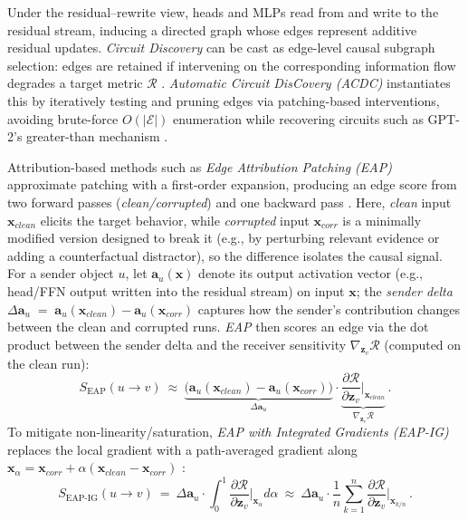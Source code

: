 \documentclass[11pt,letterpaper]{mystyle}
\begin{document}
Under the residual--rewrite view, heads and MLPs read from and write to the residual stream, inducing a directed graph whose edges represent additive residual updates.
\textit{Circuit Discovery} can be cast as edge-level causal subgraph selection: edges are retained if intervening on the corresponding information flow degrades a target metric $\mathcal{R}$ \citep{goldowsky2023localizing}.
\textit{Automatic Circuit DisCovery (ACDC)} instantiates this by iteratively testing and pruning edges via patching-based interventions, avoiding brute-force $O(|\mathcal{E}|)$ enumeration while recovering circuits such as GPT-2's greater-than mechanism \citep{conmy2023automated,Hannacicuits_nips2023}.

Attribution-based methods such as \textit{Edge Attribution Patching (EAP)} approximate patching with a first-order expansion, producing an edge score from two forward passes (\textit{clean/corrupted}) and one backward pass \citep{syedetal2024attribution,hanna2024have}.
Here, \textit{clean} input $\mathbf{x}_{clean}$ elicits the target behavior, while \textit{corrupted} input $\mathbf{x}_{corr}$ is a minimally modified version designed to break it (e.g., by perturbing relevant evidence or adding a counterfactual distractor), so the difference isolates the causal signal.
For a sender object $u$, let $\mathbf{a}_u(\mathbf{x})$ denote its output activation vector (e.g., head/FFN output written into the residual stream) on input $\mathbf{x}$; the \textit{sender delta}
$
\Delta \mathbf{a}_u \;=\; \mathbf{a}_u(\mathbf{x}_{clean})-\mathbf{a}_u(\mathbf{x}_{corr})
$
captures how the sender’s contribution changes between the clean and corrupted runs.
\textit{EAP} then scores an edge via the dot product between the sender delta and the receiver sensitivity $\nabla_{\mathbf{z}_v}\mathcal{R}$ (computed on the clean run):
\begin{equation}
S_{\text{EAP}}(u\to v)\ \approx\ 
\underbrace{\big(\mathbf{a}_u(\mathbf{x}_{clean})-\mathbf{a}_u(\mathbf{x}_{corr})\big)}_{\Delta \mathbf{a}_u}
\cdot
\underbrace{\frac{\partial \mathcal{R}}{\partial \mathbf{z}_v}\Big|_{\mathbf{x}_{clean}}}_{\nabla_{\mathbf{z}_v}\mathcal{R}} \, .
\end{equation}
To mitigate non-linearity/saturation, \textit{EAP with Integrated Gradients (EAP-IG)} replaces the local gradient with a path-averaged gradient along
$\mathbf{x}_{\alpha}=\mathbf{x}_{corr}+\alpha(\mathbf{x}_{clean}-\mathbf{x}_{corr})$ \citep{sundararajan2017axiomatic,hanna2024have,huang-etal-2025-pierce}:
\begin{equation}
S_{\text{EAP-IG}}(u\to v)\ =\ 
\Delta \mathbf{a}_u \cdot \int_{0}^{1}\frac{\partial \mathcal{R}}{\partial \mathbf{z}_v}\Big|_{\mathbf{x}_{\alpha}} d\alpha
\ \approx\ 
\Delta \mathbf{a}_u \cdot \frac{1}{n}\sum_{k=1}^{n}\frac{\partial \mathcal{R}}{\partial \mathbf{z}_v}\Big|_{\mathbf{x}_{k/n}} \, .
\end{equation}
\end{document}
